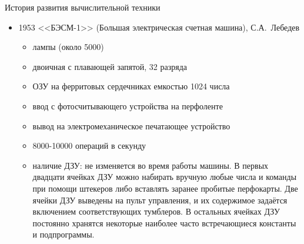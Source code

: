 \documentclass[aspectratio=169,14pt]{beamer}
\begin{document}
\begin{frame}{История развития вычислительной техники}
    \begin{itemize}
        \item 1953 <<БЭСМ-1>> (Большая электрическая счетная машина), С.А.~Лебедев
        \begin{itemize}
            \item лампы (около 5000)
            \item двоичная с плавающей запятой, 32 разряда
            \item ОЗУ на ферритовых сердечниках емкостью 1024 числа
            \item ввод с фотосчитывающего устройства на перфоленте
            \item вывод на электромеханическое печатающее устройство
            \item 8000-10000 операций в секунду
            \item \begin{spacing}{0.8}наличие ДЗУ:  не изменяется во время работы машины.
            В первых двадцати ячейках ДЗУ можно набирать вручную любые числа и
            команды при помощи штекеров либо вставлять заранее пробитые перфокарты.
            Две ячейки ДЗУ выведены на пульт управления, и их содержимое задаётся
            включением соответствующих тумблеров. В остальных ячейках ДЗУ постоянно
            хранятся некоторые наиболее часто встречающиеся константы и подпрограммы.
            \end{spacing}
        \end{itemize}
    \end{itemize}
\end{frame}
\end{document}
